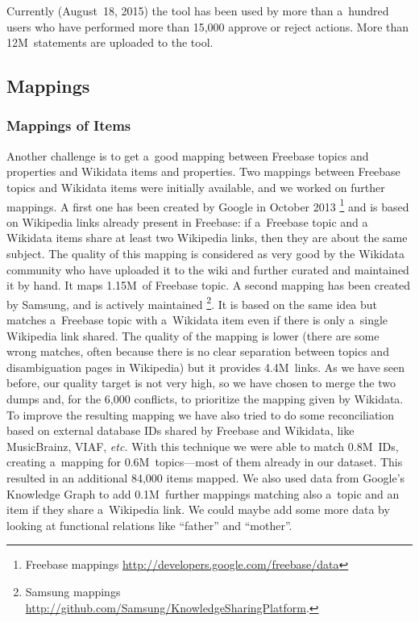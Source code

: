 \documentclass{sig-alternate}
\begin{document}
Currently (August~18, 2015) the tool has been used by more than a~hundred users
who have performed more than 15,000 approve or reject actions.
More than 12M~statements are uploaded to the tool.

\subsection{Mappings}

\subsubsection{Mappings of Items}

Another challenge is to get a~good mapping between Freebase topics and properties
and Wikidata items and properties.
Two mappings between Freebase topics and Wikidata items were initially available,
and we worked on further mappings.
A first one has been created by Google in October 2013%
\footnote{Freebase mappings \url{http://developers.google.com/freebase/data}}
and is based on Wikipedia links already present in Freebase: if a~Freebase topic and
a Wikidata items share at least two Wikipedia links, then they are about the same subject.
The quality of this mapping is considered as very good by the Wikidata community
who have uploaded it to the wiki and further curated and maintained it by hand.
It maps 1.15M~of Freebase topic.
A second mapping has been created by Samsung, and is actively maintained%
\footnote{Samsung mappings \url{http://github.com/Samsung/KnowledgeSharingPlatform}.}.
It is based on the same idea but matches a~Freebase topic with a~Wikidata item
even if there is only a~single Wikipedia link shared.
The quality of the mapping is lower (there are some wrong matches,
often because there is no clear separation between topics and disambiguation pages in Wikipedia)
but it provides 4.4M~links.
As we have seen before, our quality target is not very high,
so we have chosen to merge the two dumps and, for the 6,000 conflicts,
to prioritize the mapping given by Wikidata.
To improve the resulting mapping we have also tried to do some reconciliation
based on external database IDs shared by Freebase and Wikidata, like MusicBrainz, VIAF, \emph{etc.}
With this technique we were able to match 0.8M~IDs,
creating a~mapping for 0.6M~topics---most of them already in our dataset.
This resulted in an additional 84,000 items mapped.
We also used data from Google's Knowledge Graph to add 0.1M~further mappings
matching also a~topic and an item if they share a~Wikipedia link.
We could maybe add some more data by looking at functional relations like ``father'' and ``mother''.
\end{document}
